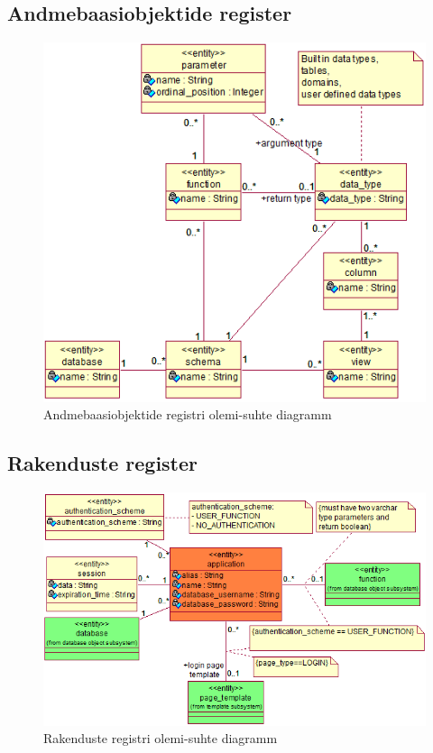 \documentclass[a4paper,12pt]{article} %
\begin{document}
\subsection{Andmebaasiobjektide register}
\begin{figure}[H]
\begin{center}
\includegraphics[bb=0 0 485 456,scale=1]{./diagrams/database-object-er-diagram.png}
\caption{Andmebaasiobjektide registri olemi-suhte diagramm}
\label{fig_andmebaasiobjektide_registri_olemi_suhte_diagramm}
\end{center}
\end{figure}

\subsection{Rakenduste register}
\begin{figure}[H]
\begin{center}
\includegraphics[bb=0 0 614 374,scale=1]{./diagrams/applications-er-diagram.png}
\caption{Rakenduste registri olemi-suhte diagramm}
\label{fig_rakenduste_registri_olemi_suhte_diagramm}
\end{center}
\end{figure}
\end{document}
